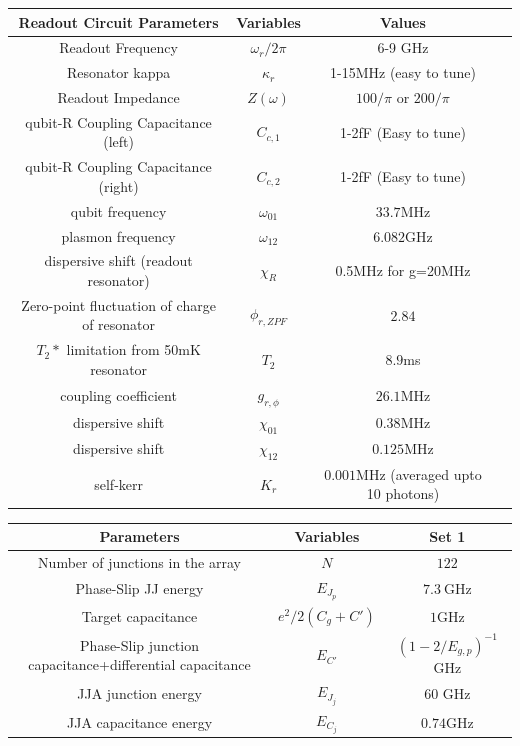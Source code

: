 \documentclass[%
reprint,
superscriptaddress,
 amsmath,amssymb,
 aps,
 prx,
longbibliography,
floatfix,
]{revtex4-2}
\begin{document}
\begin{table}[htb]
\begin{center}
\begin{tabular}{|c |c| c |c| }
 \hline
 \textbf{Readout Circuit Parameters} & \textbf{Variables} & \textbf{Values}\\ 
\hline
Readout Frequency&$\omega_r/2\pi$ &6-9 GHz\\
 \hline
 Resonator kappa&$\kappa_r$ &1-15MHz (easy to tune)\\
 \hline
Readout Impedance & $Z(\omega)$ & $100/\pi$ or $200/\pi$\\
 \hline
 qubit-R Coupling Capacitance (left) &$C_{c,1}$ &1-2fF (Easy to tune)\\
 \hline
 qubit-R Coupling Capacitance (right) &$C_{c,2}$ &1-2fF (Easy to tune)\\
 \hline
qubit frequency &$\omega_{01}$&$33.7$MHz\\ 
 \hline
plasmon frequency &$\omega_{12}$&$6.082$GHz\\ 
 \hline
dispersive shift (readout resonator) &$\chi_{R}$&0.5MHz for g=20MHz\\ 
 \hline
Zero-point fluctuation of charge of resonator &$\phi_{r,ZPF}$&$2.84$\\
 \hline
$T_2*$ limitation from 50mK resonator &$T_2$&$8.9$ms\\
 \hline
coupling coefficient &$g_{r,\phi}$&$26.1$MHz\\
 \hline
dispersive shift &$\chi_{01}$&$0.38$MHz\\
 \hline
dispersive shift &$\chi_{12}$&$0.125$MHz\\
 \hline
self-kerr &$K_r$&$0.001$MHz (averaged upto 10 photons)\\
 \hline
 \end{tabular}
\end{center}
\begin{center}
\begin{tabular}{|c |c |c|}
 \hline
\textbf{Parameters}&\textbf{Variables} &Set 1\\ 
 \hline
Number of junctions in the array&$N$ &$122$\\ 
 \hline
Phase-Slip JJ energy&$E_{J_p}$ &$7.3 \ \mathrm{GHz}$\\ 
\hline
Target capacitance&$e^2/2(C_g+C')$ &$1$GHz\\ 
\hline
Phase-Slip junction capacitance+differential capacitance &$E_{C'}$ &$(1-2/E_{g,p})^{-1}$GHz\\ 
\hline
JJA junction energy&$E_{J_j}$&60 GHz\\ 
\hline
JJA capacitance energy&$E_{C_j}$&$0.74$GHz\\ 

\end{tabular}
\end{center}
\end{table}
\end{document}
